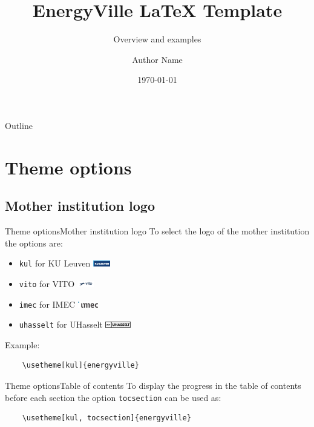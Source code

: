 \documentclass[aspectratio=169, 11pt]{beamer}
\title[EnergyVille Template]{EnergyVille LaTeX Template}
\subtitle{Overview and examples}
\author{Author Name}
\institute{EnergyVille}
\date{\today}
\begin{document}
\begin{frame}
	\titlepage
\end{frame}
	

\begin{frame}{Outline}
	\hfill	{\large \parbox{0.95\textwidth}{\tableofcontents[hideothersubsections]}}
\end{frame}

\section{Theme options}
\subsection{Mother institution logo}
\begin{frame}[fragile]{Theme options}{Mother institution logo} %
To select the logo of the mother institution the options are:
\begin{itemize}
	\item \texttt{kul} \qquad for KU Leuven \includegraphics[height=10px]{graphics/kul}
	\item \texttt{vito} \quad for VITO \includegraphics[height=10px]{graphics/vito}
	\item \texttt{imec} \qquad for  IMEC \includegraphics[height=10px]{graphics/imec}
	\item \texttt{uhasselt} \qquad for UHasselt \includegraphics[height=10px]{graphics/uhasselt}
\end{itemize}

Example:
\begin{verbatim}
    \usetheme[kul]{energyville}
\end{verbatim}
\end{frame}

\begin{frame}[fragile]{Theme options}{Table of contents}
To display the progress in the table of contents before each section the option \texttt{tocsection} can be used as:

\begin{verbatim}
    \usetheme[kul, tocsection]{energyville}
\end{verbatim}
\end{frame}
\end{document}
